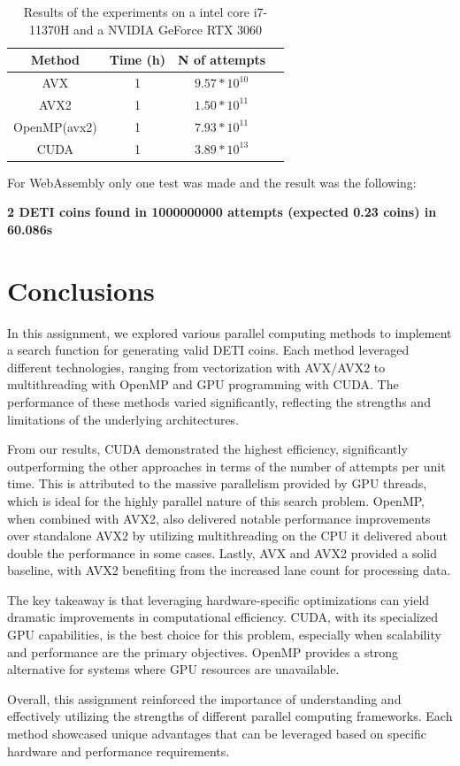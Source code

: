 \documentclass[a4paper,12pt]{article}
\begin{document}
\begin{table}[H]
    \centering
    \begin{tabular}{|c|c|c|c|}
        \hline
        \textbf{Method} & \textbf{Time (h)} & \textbf{N of attempts}  \\
        \hline
        AVX & 1 & $9.57*10^{10}$   \\
        AVX2 & 1 &  $1.50*10^{11}$ \\
        OpenMP(avx2) & 1 & $7.93*10^{11}$  \\
        CUDA & 1 & $3.89*10^{13}$  \\
        \hline
    \end{tabular}
    \caption{Results of the experiments on a intel core i7-11370H and a NVIDIA GeForce RTX 3060}
    \label{tab:results2}
\end{table}

For WebAssembly only one test was made and the result was the following:

\textbf{2 DETI coins found in 1000000000 attempts (expected 0.23 coins) in 60.086s}


\section{Conclusions}
\label{sec:discussion}

In this assignment, we explored various parallel computing methods to implement a search function for generating valid DETI coins. Each method leveraged different technologies, ranging from vectorization with AVX/AVX2 to multithreading with OpenMP and GPU programming with CUDA. The performance of these methods varied significantly, reflecting the strengths and limitations of the underlying architectures.

From our results, CUDA demonstrated the highest efficiency, significantly outperforming the other approaches in terms of the number of attempts per unit time. This is attributed to the massive parallelism provided by GPU threads, which is ideal for the highly parallel nature of this search problem. OpenMP, when combined with AVX2, also delivered notable performance improvements over standalone AVX2 by utilizing multithreading on the CPU it delivered about double the performance in some cases. Lastly, AVX and AVX2 provided a solid baseline, with AVX2 benefiting from the increased lane count for processing data.

The key takeaway is that leveraging hardware-specific optimizations can yield dramatic improvements in computational efficiency. CUDA, with its specialized GPU capabilities, is the best choice for this problem, especially when scalability and performance are the primary objectives. OpenMP provides a strong alternative for systems where GPU resources are unavailable.

Overall, this assignment reinforced the importance of understanding and effectively utilizing the strengths of different parallel computing frameworks. Each method showcased unique advantages that can be leveraged based on specific hardware and performance requirements.
\end{document}
